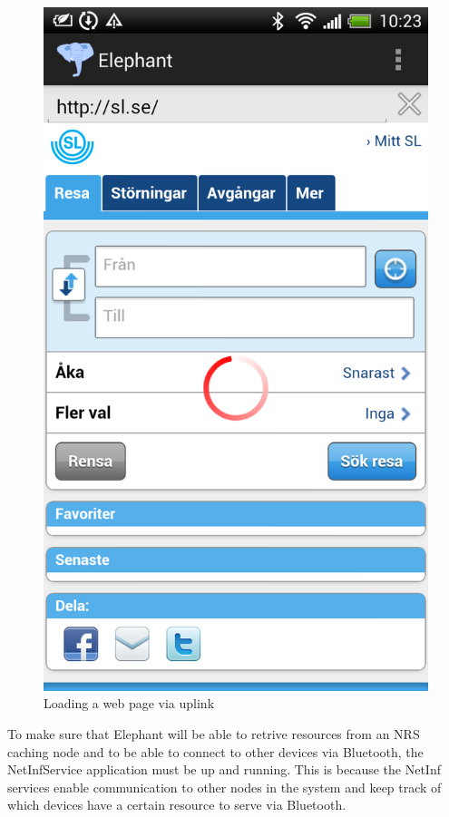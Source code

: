 \begin{figure}
\centering
\includegraphics[scale=0.29]{img/loaded_page.png}
\caption{Loading a web page via uplink}\label{fig:loaded_page}
\end{figure}

To make sure that Elephant will be able to retrive resources from an NRS caching node and to be able
to connect to other devices via Bluetooth, the NetInfService application must be up and running.
This is because the NetInf services enable communication to other nodes in the system and keep
track of which devices have a certain resource to serve via Bluetooth.


